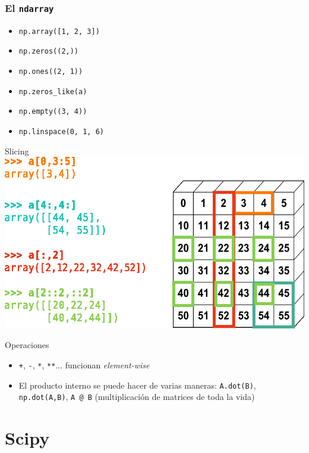 \documentclass{beamer}
\begin{document}
\begin{frame}\frametitle{El \texttt{ndarray}}
	\begin{itemize}
		\item \texttt{np.array([1, 2, 3])}
		\item \texttt{np.zeros((2,))}
		\item \texttt{np.ones((2, 1))}
		\item \texttt{np.zeros\_like(a)}
		\item \texttt{np.empty((3, 4))}
		\item \texttt{np.linspace(0, 1, 6)}
	\end{itemize}
\end{frame}

\begin{frame}{Slicing}
	\includegraphics[width=\textwidth]{fig/slicing.png}
\end{frame}

\begin{frame}{Operaciones}
	\begin{itemize}
		\item \texttt{+}, \texttt{-}, \texttt{*}, \texttt{**}... funcionan \textsl{element-wise}
		\item El producto interno se puede hacer de varias maneras: \texttt{A.dot(B)}, \texttt{np.dot(A,B)}, \texttt{A @ B} (multiplicación de matrices de toda la vida)
	\end{itemize}
\end{frame}

\section{Scipy}
\end{document}
